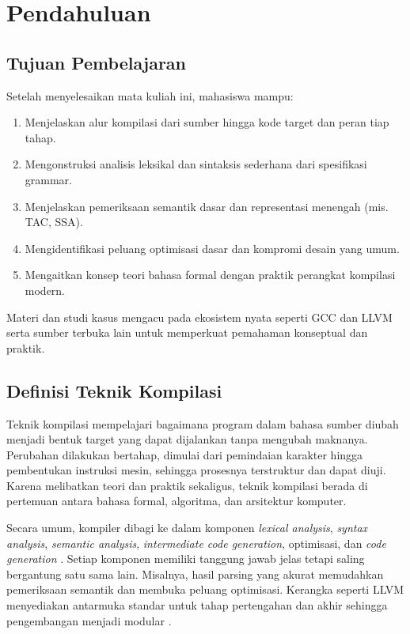 \documentclass[../main.tex]{subfiles}
\begin{document}
\chapter{Pendahuluan}

\section{Tujuan Pembelajaran}
Setelah menyelesaikan mata kuliah ini, mahasiswa mampu:
\begin{enumerate}[label=\alph*)]
  \item Menjelaskan alur kompilasi dari sumber hingga kode target dan peran tiap tahap.
  \item Mengonstruksi analisis leksikal dan sintaksis sederhana dari spesifikasi grammar.
  \item Menjelaskan pemeriksaan semantik dasar dan representasi menengah (mis. TAC, SSA).
  \item Mengidentifikasi peluang optimisasi dasar dan kompromi desain yang umum.
  \item Mengaitkan konsep teori bahasa formal dengan praktik perangkat kompilasi modern.
\end{enumerate}

Materi dan studi kasus mengacu pada ekosistem nyata seperti GCC dan LLVM \citep{GCCInternals,LLVMOverview,LLVMKaleidoscope} serta sumber terbuka lain untuk memperkuat pemahaman konseptual dan praktik.

\section{Definisi Teknik Kompilasi}
Teknik kompilasi mempelajari bagaimana program dalam bahasa sumber diubah menjadi bentuk target yang dapat dijalankan tanpa mengubah maknanya. Perubahan dilakukan bertahap, dimulai dari pemindaian karakter hingga pembentukan instruksi mesin, sehingga prosesnya terstruktur dan dapat diuji. Karena melibatkan teori dan praktik sekaligus, teknik kompilasi berada di pertemuan antara bahasa formal, algoritma, dan arsitektur komputer.

Secara umum, kompiler dibagi ke dalam komponen \emph{lexical analysis}, \emph{syntax analysis}, \emph{semantic analysis}, \emph{intermediate code generation}, optimisasi, dan \emph{code generation} \citep{Mogensen2010,Wirth1996}. Setiap komponen memiliki tanggung jawab jelas tetapi saling bergantung satu sama lain. Misalnya, hasil parsing yang akurat memudahkan pemeriksaan semantik dan membuka peluang optimisasi. Kerangka seperti LLVM menyediakan antarmuka standar untuk tahap pertengahan dan akhir sehingga pengembangan menjadi modular \citep{LLVMOverview}.
\end{document}
